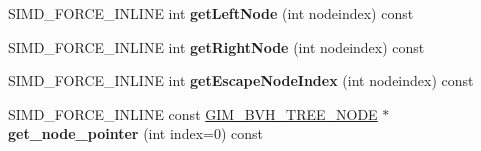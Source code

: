 \begin{DoxyCompactItemize}
\mbox{\label{classbtBvhTree_ac46b4e7e39ead78998d89a7e89cf910d}} 
S\+I\+M\+D\+\_\+\+F\+O\+R\+C\+E\+\_\+\+I\+N\+L\+I\+NE int {\bfseries get\+Left\+Node} (int nodeindex) const
\item 
\mbox{\label{classbtBvhTree_a3ba8fe7e16650e9b3c0625549ae9020d}} 
S\+I\+M\+D\+\_\+\+F\+O\+R\+C\+E\+\_\+\+I\+N\+L\+I\+NE int {\bfseries get\+Right\+Node} (int nodeindex) const
\item 
\mbox{\label{classbtBvhTree_a8f06e5e1697b5b72a18222881aabd071}} 
S\+I\+M\+D\+\_\+\+F\+O\+R\+C\+E\+\_\+\+I\+N\+L\+I\+NE int {\bfseries get\+Escape\+Node\+Index} (int nodeindex) const
\item 
\mbox{\label{classbtBvhTree_ae86c903c3301ff46eb205129d2321206}} 
S\+I\+M\+D\+\_\+\+F\+O\+R\+C\+E\+\_\+\+I\+N\+L\+I\+NE const \hyperlink{classGIM__BVH__TREE__NODE}{G\+I\+M\+\_\+\+B\+V\+H\+\_\+\+T\+R\+E\+E\+\_\+\+N\+O\+DE} $\ast$ {\bfseries get\+\_\+node\+\_\+pointer} (int index=0) const
\end{DoxyCompactItemize}

